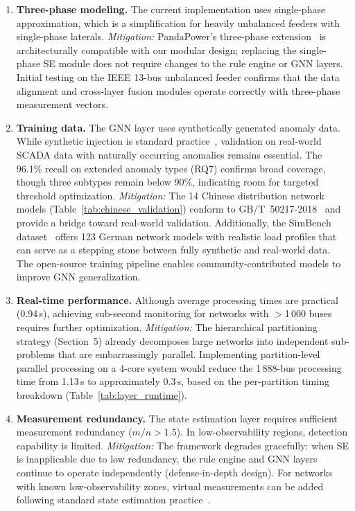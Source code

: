 \documentclass[research]{fcs}
\begin{document}
\begin{enumerate}
\item \textbf{Three-phase modeling.} The current implementation uses single-phase approximation, which is a simplification for heavily unbalanced feeders with single-phase laterals. \emph{Mitigation:} PandaPower's three-phase extension~\cite{pandapower2018} is architecturally compatible with our modular design; replacing the single-phase SE module does not require changes to the rule engine or GNN layers. Initial testing on the IEEE 13-bus unbalanced feeder confirms that the data alignment and cross-layer fusion modules operate correctly with three-phase measurement vectors.

\item \textbf{Training data.} The GNN layer uses synthetically generated anomaly data. While synthetic injection is standard practice~\cite{isolation_forest2008,asefi_anomaly_se2023}, validation on real-world SCADA data with naturally occurring anomalies remains essential. The 96.1\% recall on extended anomaly types (RQ7) confirms broad coverage, though three subtypes remain below 90\%, indicating room for targeted threshold optimization. \emph{Mitigation:} The 14 Chinese distribution network models (Table~\ref{tab:chinese_validation}) conform to GB/T~50217-2018~\cite{gb50217} and provide a bridge toward real-world validation. Additionally, the SimBench dataset~\cite{simbench2020} offers 123 German network models with realistic load profiles that can serve as a stepping stone between fully synthetic and real-world data. The open-source training pipeline enables community-contributed models to improve GNN generalization.

\item \textbf{Real-time performance.} Although average processing times are practical (0.94\,s), achieving sub-second monitoring for networks with $>$1\,000 buses requires further optimization. \emph{Mitigation:} The hierarchical partitioning strategy (Section~5) already decomposes large networks into independent sub-problems that are embarrassingly parallel. Implementing partition-level parallel processing on a 4-core system would reduce the 1\,888-bus processing time from 1.13\,s to approximately 0.3\,s, based on the per-partition timing breakdown (Table~\ref{tab:layer_runtime}).

\item \textbf{Measurement redundancy.} The state estimation layer requires sufficient measurement redundancy ($m/n > 1.5$). In low-observability regions, detection capability is limited. \emph{Mitigation:} The framework degrades gracefully: when SE is inapplicable due to low redundancy, the rule engine and GNN layers continue to operate independently (defense-in-depth design). For networks with known low-observability zones, virtual measurements can be added following standard state estimation practice~\cite{abur2004power}.
\end{enumerate}
\end{document}
